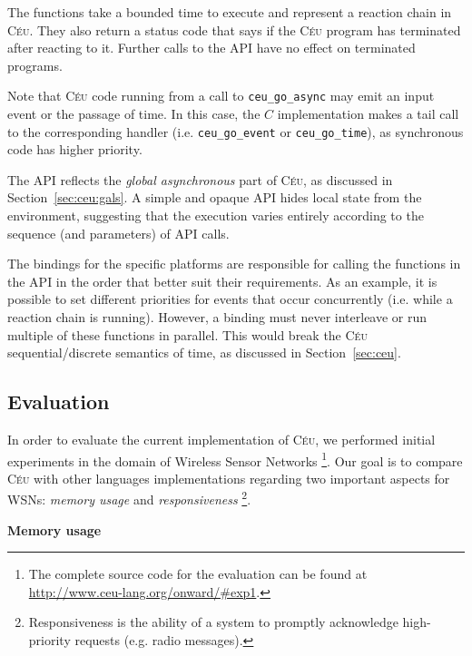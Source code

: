 \documentclass{sigplan-proc}
\newcommand{\2}{\;\;}
\newcommand{\5}{\;\;\;\;\;}
\newcommand{\CEU}{\textsc{C\'{e}u}}
\newcommand{\nesc}{\emph{nesC}}
\newcommand{\code}[1] {{\small{\texttt{#1}}}}
\begin{document}
The functions take a bounded time to execute and represent a reaction chain in 
\CEU{}.
They also return a status code that says if the \CEU{} program has terminated 
after reacting to it.
Further calls to the API have no effect on terminated programs.

Note that \CEU{} code running from a call to \code{ceu\_go\_async} may emit an 
input event or the passage of time.
In this case, the $C$ implementation makes a tail call to the corresponding 
handler (i.e.  \code{ceu\_go\_event} or \code{ceu\_go\_time}), as synchronous 
code has higher priority.

The API reflects the \emph{global asynchronous} part of \CEU{}, as discussed in 
Section~\ref{sec:ceu:gals}.
A simple and opaque API hides local state from the environment, suggesting that 
the execution varies entirely according to the sequence (and parameters) of API 
calls.

The bindings for the specific platforms are responsible for calling the 
functions in the API in the order that better suit their requirements.
As an example, it is possible to set different priorities for events that occur 
concurrently (i.e. while a reaction chain is running).
However, a binding must never interleave or run multiple of these functions in 
parallel.
This would break the \CEU{} sequential/discrete semantics of time, as discussed 
in Section~\ref{sec:ceu}.


\subsection{Evaluation}

In order to evaluate the current implementation of \CEU{}, we performed initial
experiments in the domain of Wireless Sensor Networks%
\footnote{The complete source code for the evaluation can be found at \\
\url{http://www.ceu-lang.org/onward/\#exp1}.}.
Our goal is to compare \CEU{} with other languages implementations regarding 
two important aspects for WSNs: \emph{memory usage} and \emph{responsiveness}%
\footnote{Responsiveness is the ability of a system to promptly acknowledge 
high-priority requests (e.g. radio messages).}.

\textbf{Memory usage}

\newcommand{\dif}{{\small \CEU{}--\nesc{}}}
\newcommand{\s}[1]{{\small \textbf{#1}}}
\end{document}
